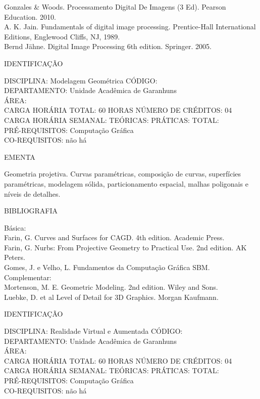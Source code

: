 \documentclass[
	12pt,				%
	openright,			%
  oneside,     %
	a4paper,			%
	chapter=TITLE,		%
	english,			%
	french,				%
	spanish,			%
	brazil				%
	]{abntex2}
\begin{document}
\begin{apendicesenv}
Gonzales \& Woods. Processamento Digital De Imagens (3 Ed). Pearson
Education. 2010.\\
A. K. Jain. Fundamentals of digital image processing. Prentice-Hall
International Editions, Englewood Cliffs, NJ, 1989.\\
Bernd Jähne. Digital Image Processing 6th edition. Springer. 2005.

\newpage IDENTIFICAÇÃO

DISCIPLINA: Modelagem Geométrica CÓDIGO:\\ 
DEPARTAMENTO: Unidade Acadêmica de Garanhuns\\ 
ÁREA: \\
CARGA HORÁRIA TOTAL: 60 HORAS NÚMERO DE CRÉDITOS: 04\\
CARGA HORÁRIA SEMANAL: TEÓRICAS: PRÁTICAS: TOTAL: \\
PRÉ-REQUISITOS: Computação Gráfica\\
CO-REQUISITOS: não há

EMENTA 

Geometria projetiva. Curvas paramétricas, composição de curvas,
superfícies paramétricas, modelagem sólida, particionamento espacial,
malhas poligonais e níveis de detalhes.

BIBLIOGRAFIA 

Básica:\\
Farin, G.  Curves and Surfaces for CAGD. 4th edition. Academic
Press.\\
Farin, G. Nurbs: From Projective Geometry to Practical Use. 2nd
edition. AK Peters.\\
Gomes, J. e Velho, L. Fundamentos da Computação Gráfica  SBM.\\
Complementar:\\
Mortenson, M. E.  Geometric Modeling. 2nd edition. Wiley and Sons.\\
Luebke, D. et al  Level of Detail for 3D Graphics. Morgan Kaufmann.

\newpage IDENTIFICAÇÃO

DISCIPLINA: Realidade Virtual e Aumentada CÓDIGO:\\ 
DEPARTAMENTO: Unidade Acadêmica de Garanhuns\\ 
ÁREA: \\
CARGA HORÁRIA TOTAL: 60 HORAS NÚMERO DE CRÉDITOS: 04\\
CARGA HORÁRIA SEMANAL: TEÓRICAS: PRÁTICAS: TOTAL: \\
PRÉ-REQUISITOS: Computação Gráfica\\
CO-REQUISITOS: não há


\end{apendicesenv}
\end{document}
